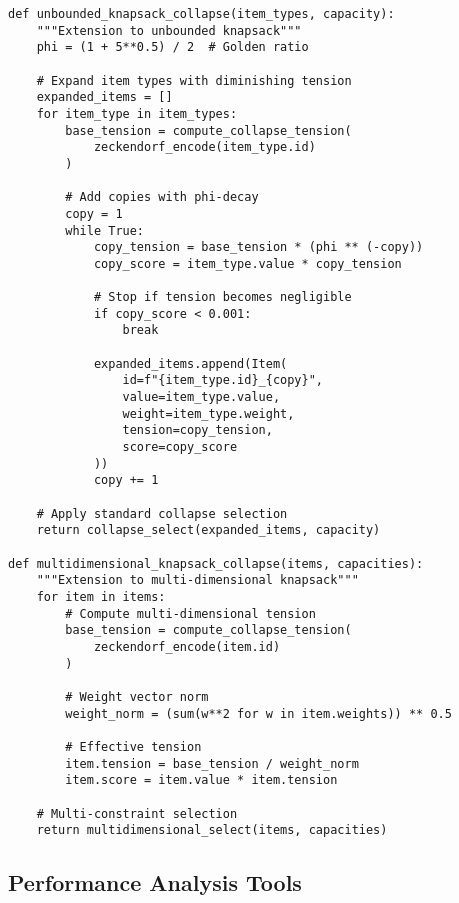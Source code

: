 \documentclass[11pt]{article}
\theoremstyle{remark}
\theoremstyle{definition}
\begin{document}
\begin{lstlisting}[caption=Multi-variant Framework]
def unbounded_knapsack_collapse(item_types, capacity):
    """Extension to unbounded knapsack"""
    phi = (1 + 5**0.5) / 2  # Golden ratio
    
    # Expand item types with diminishing tension
    expanded_items = []
    for item_type in item_types:
        base_tension = compute_collapse_tension(
            zeckendorf_encode(item_type.id)
        )
        
        # Add copies with phi-decay
        copy = 1
        while True:
            copy_tension = base_tension * (phi ** (-copy))
            copy_score = item_type.value * copy_tension
            
            # Stop if tension becomes negligible
            if copy_score < 0.001:
                break
                
            expanded_items.append(Item(
                id=f"{item_type.id}_{copy}",
                value=item_type.value,
                weight=item_type.weight,
                tension=copy_tension,
                score=copy_score
            ))
            copy += 1
    
    # Apply standard collapse selection
    return collapse_select(expanded_items, capacity)

def multidimensional_knapsack_collapse(items, capacities):
    """Extension to multi-dimensional knapsack"""
    for item in items:
        # Compute multi-dimensional tension
        base_tension = compute_collapse_tension(
            zeckendorf_encode(item.id)
        )
        
        # Weight vector norm
        weight_norm = (sum(w**2 for w in item.weights)) ** 0.5
        
        # Effective tension
        item.tension = base_tension / weight_norm
        item.score = item.value * item.tension
    
    # Multi-constraint selection
    return multidimensional_select(items, capacities)
\end{lstlisting}

\subsection{Performance Analysis Tools}
\end{document}
